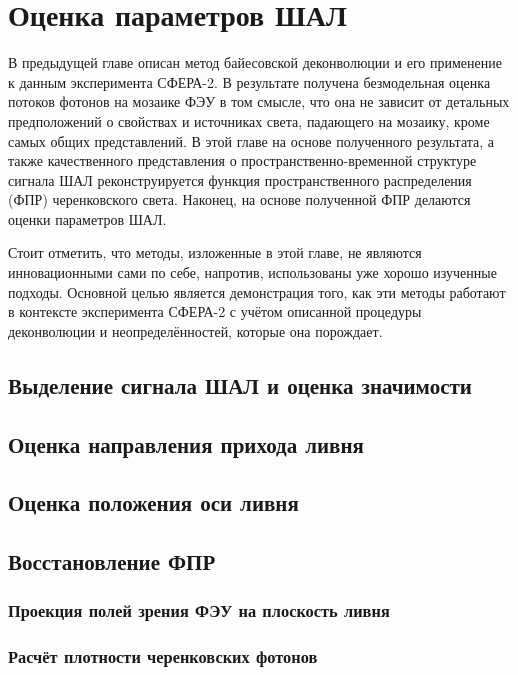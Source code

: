 \chapter{Оценка параметров ШАЛ}

В предыдущей главе описан метод байесовской деконволюции и его применение к данным эксперимента СФЕРА-2. В результате получена безмодельная оценка потоков фотонов на мозаике ФЭУ в том смысле, что она не зависит от детальных предположений о свойствах и источниках света, падающего на мозаику, кроме самых общих представлений. В этой главе на основе полученного результата, а также качественного представления о пространственно-временной структуре сигнала ШАЛ реконструируется функция пространственного распределения (ФПР) черенковского света. Наконец, на основе полученной ФПР делаются оценки параметров ШАЛ.

Стоит отметить, что методы, изложенные в этой главе, не являются инновационными сами по себе, напротив, использованы уже хорошо изученные подходы. Основной целью является демонстрация того, как эти методы работают в контексте эксперимента СФЕРА-2 с учётом описанной процедуры деконволюции и неопределённостей, которые она порождает.

\section{Выделение сигнала ШАЛ и оценка значимости}


\section{Оценка направления прихода ливня}


\section{Оценка положения оси ливня}


\section{Восстановление ФПР}

\subsection{Проекция полей зрения ФЭУ на плоскость ливня}

\subsection{Расчёт плотности черенковских фотонов}


